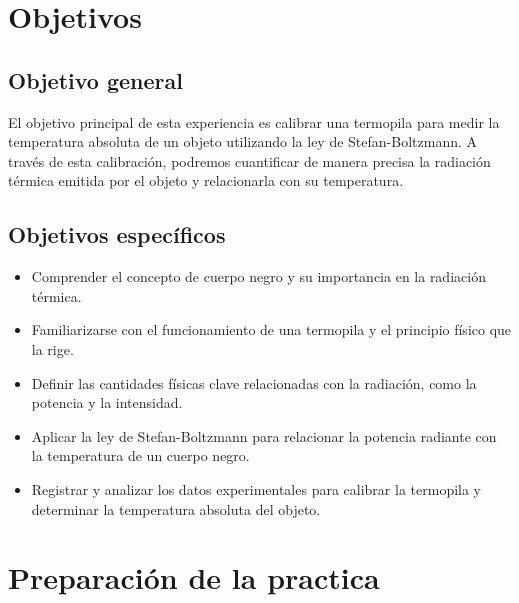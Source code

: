 \documentclass[twocolumn, 12pt]{article}
\begin{document}
\section{Objetivos}

\subsection{Objetivo general}

El objetivo principal de esta experiencia es calibrar una
termopila para medir la temperatura absoluta de un objeto
utilizando la ley de Stefan-Boltzmann. A través de esta
calibración, podremos cuantificar de manera precisa la
radiación térmica emitida por el objeto y relacionarla con
su temperatura.

\subsection{Objetivos específicos}

\begin{itemize}[label=$\triangleright$]
      \item Comprender el concepto de cuerpo negro y su importancia en
            la radiación térmica.

      \item Familiarizarse con el funcionamiento de una termopila y el
            principio físico que la rige.

      \item Definir las cantidades físicas clave relacionadas con la
            radiación, como la potencia y la intensidad.

      \item Aplicar la ley de Stefan-Boltzmann para relacionar la
            potencia radiante con la temperatura de un cuerpo negro.

      \item Registrar y analizar los datos experimentales para calibrar
            la termopila y determinar la temperatura absoluta del
            objeto.
\end{itemize}

\section{Preparación de la practica}

\end{document}
